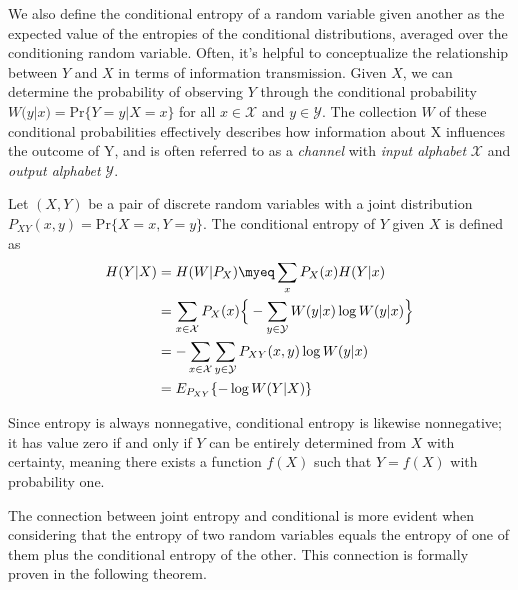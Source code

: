 \noindent We also define the conditional entropy of a random variable given another as the expected value of the entropies of the conditional distributions, averaged over the conditioning random variable.
Often, it's helpful to conceptualize the relationship between $Y$ and $X$ in terms of information transmission. Given $X$, we can determine the probability of observing $Y$ through the conditional probability $W(y|x) = \text{Pr}\{Y=y|X=x\}$ for all $x \in \mathcal{X}$ and $y \in \mathcal{Y}$. The collection $W$ of these conditional probabilities effectively describes how information about X influences the outcome of Y, and is often referred to as a \emph{channel} with \emph{input alphabet} $\mathcal{X}$ and \emph{output alphabet} $\mathcal{Y}$.

\begin{definition}\label{def:conditional_entropy}
    Let $(X,Y)$ be a pair of discrete random variables with a joint distribution $P_{XY}(x,y) = \text{Pr}\{X=x,Y=y\}$. The conditional entropy of $Y$ given $X$ is defined as
    \begin{align}
        H(Y|X) & = H(W | P_X) \myeq \sum_x P_X(x)H(Y|x)                                                       \\
               & = \sum_{x \in \mathcal{X}} P_X(x) \Big\{ -\sum_{y \in \mathcal{Y}} W(y|x) \log W(y|x) \Big\} \\
               & = -\sum_{x\in\mathcal{X}}\sum_{y\in\mathcal{Y}} P_{XY}(x,y)\log W(y|x)                       \\
               & = E_{P_{XY}} \{ -\log W(Y|X) \}
    \end{align}
\end{definition}

\noindent Since entropy is always nonnegative, conditional entropy is likewise nonnegative; it has value zero if and only if $Y$ can be entirely determined from $X$ with certainty, meaning there exists a function $f(X)$ such that $Y = f(X)$ with probability one.

\noindent The connection between joint entropy and conditional is more evident when considering that the entropy of two random variables equals the entropy of one of them plus the conditional entropy of the other. This connection is formally proven in the following theorem.

